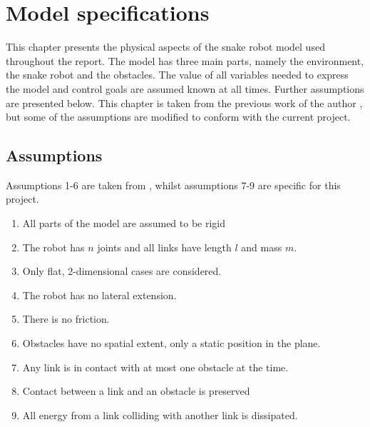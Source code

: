 \chapter{Model specifications} \label{ch:model_specs}

This chapter presents the physical aspects of the snake robot model used throughout the report. The model has three main parts, namely the environment, the snake robot and the obstacles. The value of all variables needed to express the model and control goals are assumed known at all times. Further assumptions are presented below. This chapter is taken from the previous work of the author \cite{AtussaProsjektoppgp}, but some of the assumptions are modified to conform with the current project.

\section{Assumptions}\label{seq:assumptions}

Assumptions 1-6 are taken from \cite{StavdahlNote}, whilst assumptions 7-9 are specific for this project.

\begin{enumerate}
    \item All parts of the model are assumed to be rigid
    \item The robot has $n$ joints and all links have length $l$ and mass $m$.
    \item Only flat, 2-dimensional cases are considered.
    \item The robot has no lateral extension.
    \item There is no friction. 
    \item Obstacles have no spatial extent, only a static position in the plane.
    \item Any link is in contact with at most one obstacle at the time.
    \item Contact between a link and an obstacle is preserved
    \item All energy from a link colliding with another link is dissipated.
\end{enumerate}


